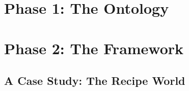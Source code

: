\part{Phase 1: The Ontology}












\part{Phase 2: The Framework}


\chapter{A Case Study: The Recipe World}\label{ch: Case Study: Recipe World}